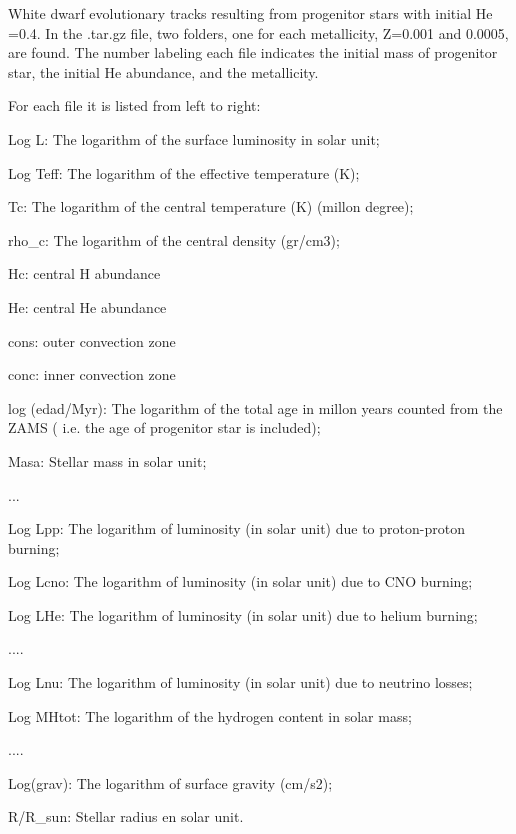 
White  dwarf evolutionary  tracks  resulting   from  progenitor stars
with initial He =0.4.   In  the  .tar.gz  file, two folders,  one  for  each
metallicity,  Z=0.001 and 0.0005, are  found.  The  number
labeling each file indicates the initial mass of progenitor star, the
initial He abundance, and the metallicity.

For each file it is listed from left to right:


Log L: The logarithm of the surface luminosity in solar unit;

Log Teff: The logarithm of the effective temperature (K);

Tc: The logarithm of the central temperature (K) (millon degree);

rho_c: The logarithm of the central density (gr/cm3);

Hc: central H abundance

He: central He abundance

cons: outer convection zone

conc: inner convection zone

log (edad/Myr): The logarithm of the total age in millon years counted from the ZAMS (
i.e. the age of progenitor star is included);

Masa: Stellar mass in solar unit;

...

Log Lpp: The logarithm of luminosity (in solar unit) due to proton-proton burning;

Log Lcno: The logarithm of luminosity (in solar unit) due to CNO burning;

Log LHe: The logarithm of luminosity (in solar unit) due to helium burning;

....

Log Lnu: The logarithm of luminosity (in solar unit) due to neutrino losses;

Log MHtot: The logarithm of the hydrogen content in solar mass;

....

Log(grav): The logarithm of surface gravity (cm/s2);

R/R_sun: Stellar radius en solar unit.
